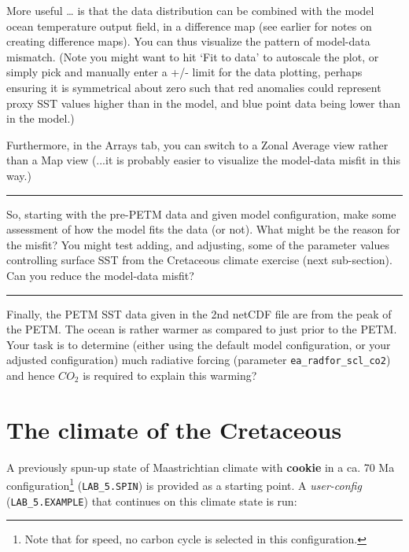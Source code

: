 More useful … is that the data distribution can be combined with the model ocean temperature output field, in a difference map (see earlier for notes on creating difference maps). You can thus visualize the pattern of model-data mismatch. (Note you might want to hit ‘Fit to data’ to autoscale the plot, or simply pick and manually enter a +/- limit for the data plotting, perhaps ensuring it is symmetrical about zero such that red anomalies could represent proxy SST values higher than in the model, and blue point data being lower than in the model.)

Furthermore, in the Arrays tab, you can switch to a Zonal Average view rather than a Map view (...it is probably easier to visualize the model-data misfit in this way.)

\vspace{1mm}
\noindent\rule{4cm}{0.1mm}
\vspace{2mm}

\noindent So, starting with the pre-PETM data and given model configuration, make some assessment of how the model fits the data (or not). What might be the reason for the misfit? You might test adding, and adjusting, some of the parameter values controlling surface SST from the Cretaceous climate exercise (next sub-section). Can you reduce the model-data misfit?

\vspace{1mm}
\noindent\rule{4cm}{0.1mm}
\vspace{2mm}

\noindent Finally, the PETM SST data given in the 2nd netCDF file are from the peak of the PETM. The ocean is rather warmer as compared to just prior to the PETM. Your task is to determine (either using the default model configuration, or your adjusted configuration) much radiative forcing (parameter \texttt{ea\_radfor\_scl\_co2}) and hence \(CO_{2}\) is required to explain this warming?

\newpage

\section{The climate of the Cretaceous}

A previously spun-up state of Maastrichtian climate with \textbf{cookie} in a ca. 70 Ma configuration\footnote{Note that for speed, no carbon cycle is selected in this configuration.} (\texttt{LAB\_5.SPIN}) is provided as a starting point. A \textit{user-config} (\texttt{LAB\_5.EXAMPLE}) that continues on this climate state is run:

